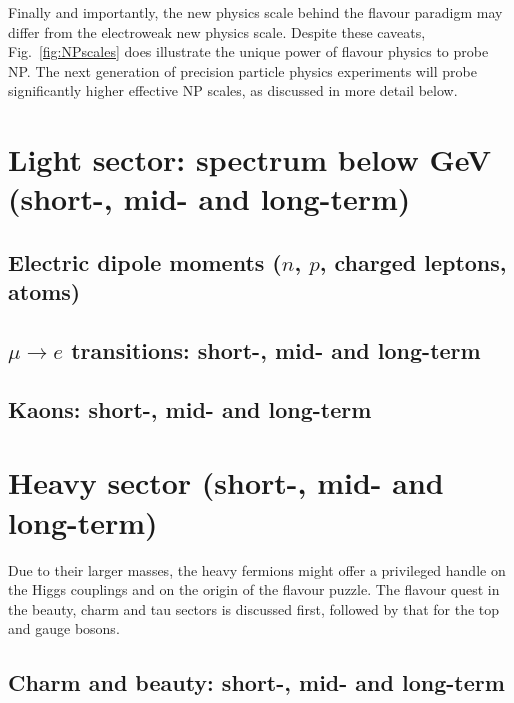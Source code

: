 \documentclass[../report.tex]{subfiles}
\begin{document}
Finally and importantly, the  new physics scale behind the flavour paradigm may differ from the  electroweak new physics scale.  Despite these caveats, Fig.~\ref{fig:NPscales} does illustrate the unique power of flavour physics to probe NP.
 The next generation of precision particle physics experiments will probe significantly higher effective NP scales, as discussed in more detail below. 









  







    


 
 

\section {Light sector: spectrum below GeV (short-, mid- and long-term)}
\subsection{Electric dipole moments ($n$, $p$, charged leptons, atoms)}


\subsection{$\mu \to e$ transitions: short-, mid- and long-term}

\subsection{Kaons: short-, mid- and long-term}


\section{Heavy sector (short-, mid- and long-term)}
 Due to their larger masses, the heavy fermions might offer a privileged  handle on the Higgs couplings and on the origin of the flavour puzzle. The flavour quest in the beauty, charm and tau sectors is discussed first, followed by that for the top and gauge bosons. 
\subsection{Charm and beauty: short-, mid- and long-term}

\end{document}
